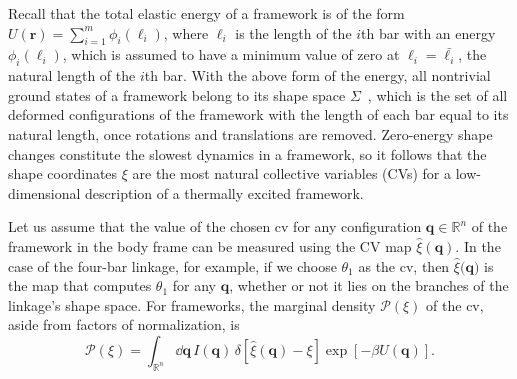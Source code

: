 Recall that the total elastic energy of a framework is of the form $U(\bm{r}) = \sum_{i=1}^{m} \phi_{i}(\ell_{i})$, where $\ell_{i}$ is the length of the $i$th bar with an energy $\phi_i(\ell_{i})$, which is assumed to have a minimum value of zero at $\ell_{i} = \bar{\ell_{i}}$, the natural length of the $i$th bar.
%
With the above form of the energy, all nontrivial ground states of a framework belong to its shape space $\Sigma$~\cite{kendall1989,mezey1993,kendall1999}, which is the set of all deformed configurations of the framework with the length of each bar equal to its natural length, once rotations and translations are removed.
Zero-energy shape changes constitute the slowest dynamics in a framework, so it follows that the shape coordinates $\xi$ are the most natural collective variables (CVs) for a low-dimensional description of a thermally excited framework.
%

Let us assume that the value of the chosen \ac{cv} for any configuration $\bm{q} \in \mathbb{R}^{n}$ of the framework in the body frame can be measured using the CV map $\hat{\xi}(\bm{q})$.
In the case of the four-bar linkage, for example, if we choose $\theta_{1}$ as the \ac{cv}, then $\hat{\xi}(\bm{q)}$ is the map that computes $\theta_{1}$ for any $\bm{q}$, whether or not it lies on the branches of the linkage's shape space.
For frameworks, the marginal density $\mathscr{P}(\xi)$ of the \ac{cv}, aside from factors of normalization, is
%
\begin{equation}
  \mathscr{P}(\xi) = \int_{\mathbb{R}^{n}} \dd\bm{q}\, I(\bm{q})\, \delta\left[\hat{\xi}(\bm{q}) - \xi\right] \exp\left[-\beta U(\bm{q})\right].
  \label{eq:mpd}
\end{equation}

